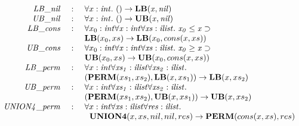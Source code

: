 \documentclass{llncs}
\begin{document}
\begin{figure}[thp]
\[\begin{array}{rcl}
{\it LB\_nil} &~:~& \forall x:\it int.~() \rightarrow {\bf LB} (x, nil) \\
{\it UB\_nil} &~:~& \forall x:\it int.~() \rightarrow {\bf UB} (x, nil) \\
{\it LB\_cons} &~:~& \forall x_0:\it int\forall x:\it int\forall xs:{\it ilist}.~x_0\leq x\supset\\
                  & &
{\bf LB} (x_0, xs) \rightarrow {\bf LB} (x_0, cons (x, xs)) \\
{\it UB\_cons} &~:~& \forall x_0:\it int\forall x:\it int\forall xs:{\it ilist}.~x_0\geq x\supset\\
                  & &
{\bf UB} (x_0, xs) \rightarrow {\bf UB} (x_0, cons (x, xs)) \\

{\it LB\_perm} &~:~&
\forall x:\it int\forall xs_1:{\it ilist}\forall xs_2:{\it ilist}.~ \\
               & &
({\bf PERM} (xs_1, xs_2), {\bf LB} (x, xs_1))\rightarrow {\bf LB} (x, xs_2) \\
{\it UB\_perm} &~:~&
\forall x:\it int\forall xs_1:{\it ilist}\forall xs_2:{\it ilist}.~ \\
               & &
({\bf PERM} (xs_1, xs_2), {\bf UB} (x, xs_1))\rightarrow {\bf UB} (x, xs_2) \\

{\it UNION4\_perm} &~:~&
\forall x:\it int\forall xs:{\it ilist}\forall res:{\it ilist}.~ \\
                   & &
\kern6pt{\bf UNION4} (x, xs, nil, nil, res) \rightarrow {\bf PERM} (cons (x, xs), res) \\


\end{array}\]
\end{figure}
\end{document}
